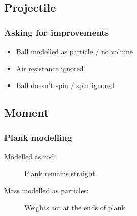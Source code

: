 \documentclass[A4paper]{article}
\begin{document}
	\subsection{Projectile}
	\subsubsection{Asking for improvements}
	\begin{itemize}
		\item Ball modelled as particle / no volume
		\item Air resistance ignored
		\item Ball doesn't spin / spin ignored
	\end{itemize}
	\subsection{Moment}
	\subsubsection{Plank modelling}
	\begin{description}
		\item[Modelled as rod: ] Plank remains straight
		\item[Mass modelled as particles: ] Weights act at the ends of plank
	\end{description}
	
	
	
	
\end{document}
